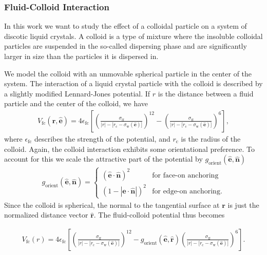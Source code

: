 \subsubsection{Fluid-Colloid Interaction}
In this work we want to study the effect of a colloidal particle on a system of discotic liquid crystals. A colloid is a type of mixture where the insoluble colloidal particles are suspended in the so-called dispersing phase and are significantly larger in size than the particles it is dispersed in.

We model the colloid with an unmovable spherical particle in the center of the system. The interaction of a liquid crystal particle with the colloid is described by a slightly modified Lennard-Jones potential. If $r$ is the distance between a fluid particle and the center of the colloid, we have 
\begin{align}
    V_{\text{fc}}(\mathbf{r},\mathbf{\hat{e}}) = 4\epsilon_{\text{fc}}\left\lbrack \left(\frac{\sigma_{\text{ff}}}{|r|-\lbrack r_{\text{c}}-\sigma_\text{w} (\mathbf{\hat{e}})\rbrack}\right)^{12} -  \left(\frac{\sigma_{\text{ff}}}{|r|-\lbrack r_{\text{c}}-\sigma_\text{w} (\mathbf{\hat{e}})\rbrack}\right)^6 \right\rbrack,
\end{align}
where $\epsilon_{\text{fc}}$ describes the strength of the potential, and $r_{\text{c}}$ is the radius of the colloid.
Again, the colloid interaction exhibits some orientational preference. To account for this we scale the attractive part of the potential by $g_{\text{orient}}(\mathbf{\hat{e}},\mathbf{\hat{n}})$
\begin{align}
\label{eq:orientation}
    g_\text{orient}(\mathbf{\hat{e}},\mathbf{\hat{n}}) = 
    \begin{cases}
     (\mathbf{\hat{e}}\cdot\mathbf{\hat{n}})^2 & \text{for face-on anchoring}\\
     (1-|\mathbf{\hat{e}}\cdot\mathbf{\hat{n}}|)^2 & \text{for edge-on anchoring.}
    \end{cases}
\end{align}
Since the colloid is spherical, the normal to the tangential surface at $\mathbf{r}$ is just the normalized distance vector $\mathbf{\hat{r}}$. The fluid-colloid potential thus becomes

\begin{align}
    V_{\text{fc}}(r) = 4\epsilon_{\text{fc}}\left\lbrack \left(\frac{\sigma_{\text{ff}}}{|r|-\lbrack r_{\text{c}}-\sigma_\text{w} (\mathbf{\hat{e}})\rbrack}\right)^{12} - g_\text{orient}(\mathbf{\hat{e}},\mathbf{\hat{r}}) \left(\frac{\sigma_{\text{ff}}}{|r|-\lbrack r_{\text{c}}-\sigma_\text{w} (\mathbf{\hat{e}})\rbrack}\right)^6 \right\rbrack.
\end{align}
